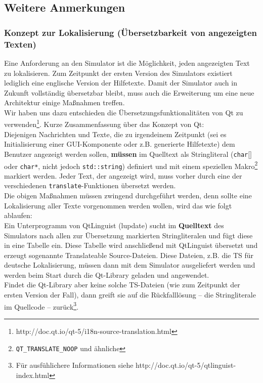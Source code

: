 \subsection{Weitere Anmerkungen}

\subsubsection{Konzept zur Lokalisierung (Übersetzbarkeit von angezeigten Texten)}

Eine Anforderung an den Simulator ist die Möglichkeit, jeden angezeigten Text zu lokalisieren. Zum Zeitpunkt der ersten Version des Simulators existiert lediglich eine englische Version der Hilfetexte. Damit der Simulator auch in Zukunft vollständig übersetzbar bleibt, muss auch die Erweiterung um eine neue Architektur einige Maßnahmen treffen.\\

Wir haben uns dazu entschieden die Übersetzungsfunktionalitäten von Qt zu verwenden\footnote{http://doc.qt.io/qt-5/i18n-source-translation.html}. Kurze Zusammenfassung über das Konzept von Qt:\\
Diejenigen Nachrichten und Texte, die zu irgendeinem Zeitpunkt (sei es Initialisierung einer GUI-Komponente oder z.B. generierte Hilfetexte) dem Benutzer angezeigt werden sollen, \textbf{müssen} im Quelltext als Stringliteral (\texttt{char$\lbrack \rbrack$} oder \texttt{char*}, nicht jedoch \texttt{std::string}) definiert und mit einem speziellen Makro\footnote{\texttt{QT\_TRANSLATE\_NOOP} und ähnliche} markiert werden. Jeder Text, der angezeigt wird, muss vorher durch eine der verschiedenen \texttt{translate}-Funktionen übersetzt werden.\\
Die obigen Maßnahmen müssen zwingend durchgeführt werden, denn sollte eine Lokalisierung aller Texte vorgenommen werden wollen, wird das wie folgt ablaufen:\\
Ein Unterprogramm von QtLinguist (lupdate) sucht im \textbf{Quelltext} des Simulators nach allen zur Übersetzung markierten Stringliteralen und fügt diese in eine Tabelle ein. Diese Tabelle wird anschließend mit QtLinguist übersetzt und erzeugt sogenannte Translateable Source-Dateien. Diese Dateien, z.B. die TS für deutsche Lokalisierung, müssen dann mit dem Simulator ausgeliefert werden und werden beim Start durch die Qt-Library geladen und angewendet.\\
Findet die Qt-Library aber keine solche TS-Dateien (wie zum Zeitpunkt der ersten Version der Fall), dann greift sie auf die Rückfalllösung -- die Stringliterale im Quellcode -- zurück\footnote{Für ausfühlichere Informationen siehe http://doc.qt.io/qt-5/qtlinguist-index.html}.\\

